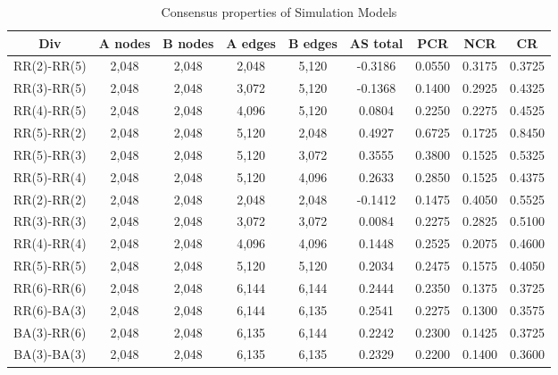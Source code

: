 \begin{table}[!htb]
	\scriptsize
	\centering
    \caption{Consensus properties of Simulation Models}
	\label{Consensus properties of Simulation Models}
	\begin{center}
		\begin{tabular}{c|c|c|c|c|c|c|c|c} \hline\hline
			Div                    & A nodes& B nodes & A edges & B edges & AS total  & PCR    & NCR    & CR       \\ \hline \hline
			RR(2)-RR(5)            & 2,048  & 2,048   & 2,048   & 5,120   & -0.3186   & 0.0550 & 0.3175 & 0.3725   \\ \hline
			RR(3)-RR(5)            & 2,048  & 2,048   & 3,072   & 5,120   & -0.1368   & 0.1400 & 0.2925 & 0.4325   \\ \hline
			RR(4)-RR(5)            & 2,048  & 2,048   & 4,096   & 5,120   &  0.0804   & 0.2250 & 0.2275 & 0.4525   \\ \hline
			RR(5)-RR(2)            & 2,048 	& 2,048   & 5,120   & 2,048   &  0.4927   & 0.6725 & 0.1725 & 0.8450   \\ \hline	
			RR(5)-RR(3)            & 2,048 	& 2,048   & 5,120   & 3,072   &  0.3555   & 0.3800 & 0.1525 & 0.5325   \\ \hline
			RR(5)-RR(4)            & 2,048  & 2,048   & 5,120   & 4,096   &  0.2633   & 0.2850 & 0.1525 & 0.4375   \\ \hline
			RR(2)-RR(2)            & 2,048  & 2,048   & 2,048   & 2,048   & -0.1412   & 0.1475 & 0.4050 & 0.5525   \\ \hline
			RR(3)-RR(3)            & 2,048  & 2,048   & 3,072   & 3,072   &  0.0084   & 0.2275 & 0.2825 & 0.5100   \\ \hline
			RR(4)-RR(4)            & 2,048  & 2,048   & 4,096   & 4,096   &  0.1448   & 0.2525 & 0.2075 & 0.4600   \\ \hline
			RR(5)-RR(5)            & 2,048  & 2,048   & 5,120   & 5,120   &  0.2034   & 0.2475 & 0.1575 & 0.4050   \\ \hline
			RR(6)-RR(6)            & 2,048  & 2,048   & 6,144   & 6,144   &  0.2444   & 0.2350 & 0.1375 & 0.3725   \\ \hline
			RR(6)-BA(3)            & 2,048 	& 2,048   & 6,144   & 6,135   &  0.2541   & 0.2275 & 0.1300 & 0.3575   \\ \hline 
			BA(3)-RR(6)            & 2,048 	& 2,048   & 6,135   & 6,144   &  0.2242   & 0.2300 & 0.1425 & 0.3725   \\ \hline
			BA(3)-BA(3)            & 2,048 	& 2,048   & 6,135   & 6,135   &  0.2329   & 0.2200 & 0.1400 & 0.3600   \\ \hline

\end{tabular}
\end{center}
\end{table}
